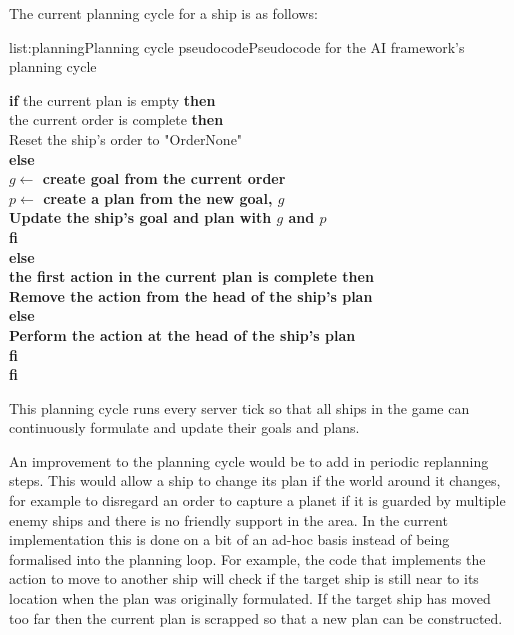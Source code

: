 The current planning cycle for a ship is as follows:

\vspace{-0.5em}
\begin{listing}{list:planning}{Planning cycle pseudocode}{Pseudocode for the AI framework's planning cycle}{}
\end{listing}\vspace{-1.5em}

\begin{tabbing}
{\bf if} the current plan is empty {\bf then} \\
 the current order is complete {\bf then} \\
\quad\quad Reset the ship's order to "OrderNone" \\
\quad\bf else \\
\quad\quad $g \leftarrow$ create goal from the current order \\
\quad\quad $p \leftarrow$ create a plan from the new goal, $g$ \\
\quad\quad Update the ship's goal and plan with $g$ and $p$ \\
\quad\bf fi \\
\bf else \\
 the first action in the current plan is complete {\bf then} \\
\quad\quad Remove the action from the head of the ship's plan \\
\quad\bf else \\
\quad\quad Perform the action at the head of the ship's plan \\
\quad\bf fi \\
\bf fi
\end{tabbing}
\noindent
This planning cycle runs every server tick so that all ships in the game can
continuously formulate and update their goals and plans.

An improvement to the planning cycle would be to add in periodic replanning steps.
This would allow a ship to change its plan if the world around it changes, for example
to disregard an order to capture a planet if it is guarded by multiple enemy ships
and there is no friendly support in the area. In the current implementation this is
done on a bit of an ad-hoc basis instead of being formalised into the planning loop.
For example, the code that implements the action to move to another ship will check
if the target ship is still near to its location when the plan was originally formulated.
If the target ship has moved too far then the current plan is scrapped so that a new
plan can be constructed.

